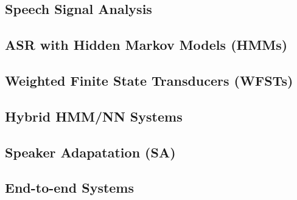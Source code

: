 \documentclass[9pt]{extarticle}
\begin{document}
  \begin{multicols}{2}
  \subsection*{Speech Signal Analysis}
  
  \subsection*{ASR with Hidden Markov Models (HMMs)}
  
  \subsection*{Weighted Finite State Transducers (WFSTs)}
  
  \subsection*{Hybrid HMM/NN Systems}
  
  \subsection*{Speaker Adapatation (SA)}
  
  \subsection*{End-to-end Systems}
  
  \end{multicols}
\end{document}
